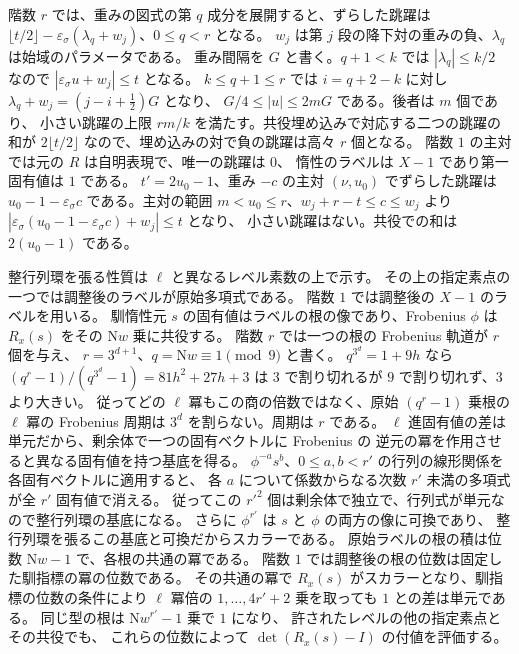 階数 \(r\) では、重みの図式の第 \(q\) 成分を展開すると、ずらした跳躍は
\(\lfloor t/2\rfloor-\varepsilon_\sigma(\lambda_q+w_j)\)、\(0\le q<r\) となる。
\(w_j\) は第 \(j\) 段の降下対の重みの負、\(\lambda_q\) は始域のパラメータである。
重み間隔を \(G\) と書く。\(q+1<k\) では
\(|\lambda_q|\le k/2\) なので \(|\varepsilon_\sigma u+w_j|\le t\) となる。
\(k\le q+1\le r\) では \(i=q+2-k\) に対し
\(\lambda_q+w_j=(j-i+\tfrac12)G\) となり、
\(G/4\le |u|\le2mG\) である。後者は \(m\) 個であり、
小さい跳躍の上限 \(rm/k\) を満たす。共役埋め込みで対応する二つの跳躍の和が
\(2\lfloor t/2\rfloor\) なので、埋め込みの対で負の跳躍は高々 \(r\) 個となる。
階数 \(1\) の主対では元の \(R\) は自明表現で、唯一の跳躍は \(0\)、
惰性のラベルは \(X-1\) であり第一固有値は \(1\) である。
\(t'=2u_0-1\)、重み \(-c\) の主対 \((\nu,u_0)\) でずらした跳躍は
\(u_0-1-\varepsilon_\sigma c\) である。主対の範囲
\(m<u_0\le r\)、\(w_j+r-t\le c\le w_j\) より
\(|\varepsilon_\sigma(u_0-1-\varepsilon_\sigma c)+w_j|\le t\) となり、
小さい跳躍はない。共役での和は \(2(u_0-1)\) である。

整行列環を張る性質は \(\ell\) と異なるレベル素数の上で示す。
その上の指定素点の一つでは調整後のラベルが原始多項式である。
階数 \(1\) では調整後の \(X-1\) のラベルを用いる。
馴惰性元 \(s\) の固有値はラベルの根の像であり、Frobenius \(\phi\) は
\(R_x(s)\) をその \(\mathrm Nw\) 乗に共役する。
階数 \(r\) では一つの根の Frobenius 軌道が \(r\) 個を与え、
\(r=3^{d+1}\)、\(q=\mathrm Nw\equiv1\pmod 9\) と書く。
\(q^{3^d}=1+9h\) なら \((q^r-1)/(q^{3^d}-1)=81h^2+27h+3\) は
\(3\) で割り切れるが \(9\) で割り切れず、\(3\) より大きい。
従ってどの \(\ell\) 冪もこの商の倍数ではなく、原始 \((q^r-1)\) 乗根の
\(\ell\) 冪の Frobenius 周期は \(3^d\) を割らない。周期は \(r\) である。
\(\ell\) 進固有値の差は単元だから、剰余体で一つの固有ベクトルに Frobenius の
逆元の冪を作用させると異なる固有値を持つ基底を得る。
\(\phi^{-a}s^b\)、\(0\le a,b<r'\) の行列の線形関係を各固有ベクトルに適用すると、
各 \(a\) について係数からなる次数 \(r'\) 未満の多項式が全 \(r'\) 固有値で消える。
従ってこの \(r'^2\) 個は剰余体で独立で、行列式が単元なので整行列環の基底になる。
さらに \(\phi^{r'}\) は \(s\) と \(\phi\) の両方の像に可換であり、
整行列環を張るこの基底と可換だからスカラーである。
原始ラベルの根の積は位数 \(\mathrm Nw-1\) で、各根の共通の冪である。
階数 \(1\) では調整後の根の位数は固定した馴指標の冪の位数である。
その共通の冪で \(R_x(s)\) がスカラーとなり、馴指標の位数の条件により
\(\ell\) 冪倍の \(1,\ldots,4r'+2\) 乗を取っても \(1\) との差は単元である。
同じ型の根は \(\mathrm Nw^{r'}-1\) 乗で \(1\) になり、
許されたレベルの他の指定素点とその共役でも、
これらの位数によって \(\det(R_x(s)-I)\) の付値を評価する。

